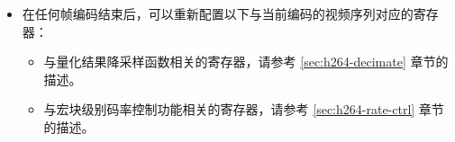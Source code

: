 \documentclass[main\_\_CN.tex]{subfiles}
\begin{document}
\begin{enumerate}
\begin{itemize}
\begin{enumerate}
            \item 启动 H264\_DMA RX 通道 4：配置方法请参考 \ref{sec:h264-dma-start} 章节的描述。
            \item 启动 H264\_DMA RX 通道 5：配置方法请参考 \ref{sec:h264-dma-start} 章节的描述。
            \item 启动 H264\_DMA TX 通道 3 和 TX 通道 4：配置方法请参考 \ref{sec:h264-dma-start} 章节的描述。
            \item 如需使用 MV 合并功能，应启动 H264\_DMA RX 通道 3：配置方法请参考 \ref{sec:h264-dma-start} 章节的描述。
            \item 启动 H264\_DMA，将参考图像从外部存储移动到内部存储：将寄存器 \hyperref[fielddesc:H264DMAMOVESTART]{H264\_DMA\_MOVE\_START} 写为 1。
            \item 等待 H264\_DMA\_MOVE\_2MB\_LINE\_DONE\_INT 中断。中断触发时，启动 H264\_DMA TX 通道 1。配置方法请参考 \ref{sec:h264-dma-start} 章节的描述。
            \item 开始图像编码：将寄存器 \hyperref[fielddesc:H264FRAMESTART]{H264\_FRAME\_START} 写为 1。
            \item 等待 H264\_DB\_TMP\_READY\_INT 中断。中断触发时，启动 H264\_DMA TX 通道 2。配置方法请参考 \ref{sec:h264-dma-start} 章节的描述。
            \item 等待 H264\_FRAME\_DONE\_INT 中断。中断触发时，表示图像编码已完成。
            \item 确保数据完全写入。方法请参考 \ref{sec:h264-dma-reset} 章节的描述。
            \item 重置 H264\_DMA 的每个发送和接收通道，参考 \ref{sec:h264-dma-reset} 章节的描述。
            \item 重置 H264\_DMA 中去块滤波器中间数据的读写计数器和参考图像数据的读写计数器。将寄存器 \hyperref[fielddesc:H264DMARXCH2INTERCOUNTERRST]{H264\_DMA\_RX\_CH2\_INTER\_COUNTER\_RST} 设置为 1，然后设置为 0。将寄存器 \hyperref[fielddesc:H264DMARXCH5INTERCOUNTERRST]{H264\_DMA\_RX\_CH5\_INTER\_COUNTER\_RST} 设置为 1，然后设置为 0。
        \end{enumerate}
        \item 在任何帧编码结束后，可以重新配置以下与当前编码的视频序列对应的寄存器：
        \begin{itemize}
            \item 与量化结果降采样函数相关的寄存器，请参考 \ref{sec:h264-decimate} 章节的描述。
            \item 与宏块级别码率控制功能相关的寄存器，请参考 \ref{sec:h264-rate-ctrl} 章节的描述。

\end{itemize}
\end{itemize}
\end{enumerate}
\end{document}
